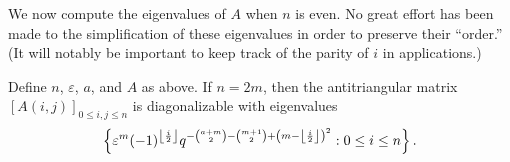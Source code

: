 We now compute the eigenvalues of $A$ when $n$ is even. No great effort has been made to the simplification of these eigenvalues in order to preserve their ``order.'' (It will notably be important to keep track of the parity of $i$ in applications.)
\begin{proposition} \label{prop:helper-matrix-even}
    Define $n$, $\varepsilon$, $a$, and $A$ as above. If $n=2m$, then the antitriangular matrix $[A(i,j)]_{0\le i,j\le n}$ is diagonalizable with eigenvalues
    \[\left\{\varepsilon^{m}(-1)^{\left\lfloor{\frac i2}\right\rfloor}q^{-\binom{a+m}2-\binom{m+1}2+\left(m-\left\lfloor{\frac i2}\right\rfloor\right)^2}:0\le i\le n\right\}.\]
\end{proposition}
